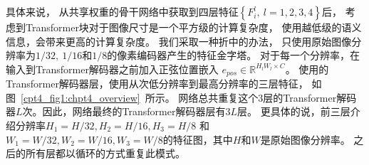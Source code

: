 具体来说，
从共享权重的骨干网络中获取到四层特征$\left \{ F_{i}^{l},~l=1,2,3,4 \right \}$后，
考虑到Transformer块对于图像尺寸是一个平方级的计算复杂度，
使用越低级的语义信息，会带来更高的计算复杂度。
我们采取一种折中的办法，
只使用原始图像分辨率为$1/32,~1/16$和$1/8$的像素编码器产生的特征金字塔。
对于每一个分辨率，在输入到Transformer解码器之前加入正弦位置嵌入
$ e_{pos}\in \mathbb{R}^{H_{l}W_{l}\times C} $。
使用的Transformer解码器层，使用从次低分辨率到最高分辨率的三层特征，
如图~\ref{cpt4_fig1:chpt4_overview}~所示。
网络总共重复这个3层的Transformer解码器$L$次。因此，网络最终的Transformer解码器层有$3L$层。
更具体的说，前三层介绍分辨率$H_{1}=H/32,H_{2}=H/16,H_{3}=H/8$
和$W_{1}=W/32,W_{2}=W/16,W_{3}=W/8$的特征图，其中$H$和$W$是原始图像分辨率。
之后的所有层都以循环的方式重复此模式。




